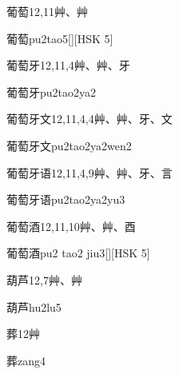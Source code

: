 \begin{entry}{葡萄}{12,11}{⾋、⾋}
  \begin{phonetics}{葡萄}{pu2tao5}[][HSK 5]
  \end{phonetics}
\end{entry}

\begin{entry}{葡萄牙}{12,11,4}{⾋、⾋、⽛}
  \begin{phonetics}{葡萄牙}{pu2tao2ya2}
  \end{phonetics}
\end{entry}

\begin{entry}{葡萄牙文}{12,11,4,4}{⾋、⾋、⽛、⽂}
  \begin{phonetics}{葡萄牙文}{pu2tao2ya2wen2}
  \end{phonetics}
\end{entry}

\begin{entry}{葡萄牙语}{12,11,4,9}{⾋、⾋、⽛、⾔}
  \begin{phonetics}{葡萄牙语}{pu2tao2ya2yu3}
  \end{phonetics}
\end{entry}

\begin{entry}{葡萄酒}{12,11,10}{⾋、⾋、⾣}
  \begin{phonetics}{葡萄酒}{pu2 tao2 jiu3}[][HSK 5]
  \end{phonetics}
\end{entry}

\begin{entry}{葫芦}{12,7}{⾋、⾋}
  \begin{phonetics}{葫芦}{hu2lu5}
  \end{phonetics}
\end{entry}

\begin{entry}{葬}{12}{⾋}
  \begin{phonetics}{葬}{zang4}
  \end{phonetics}
\end{entry}

